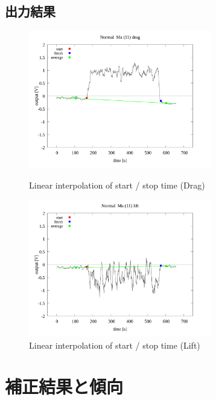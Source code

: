 \documentclass[twocolumn,a4j]{jsarticle}
\begin{document}
\subsection{出力結果}
\begin{figure}[htbp]
    \footnotesize
    \begin{center}
        \includegraphics[width=80mm]{images/Normal_ma(11)_drag_03.png}
        \caption{Linear interpolation of start / stop time (Drag)}
        \includegraphics[width=80mm]{images/Normal_ma(11)_lift_03.png}
        \caption{Linear interpolation of start / stop time (Lift)}
    \end{center}
\end{figure}
\newpage
\section{補正結果と傾向}
\end{document}
